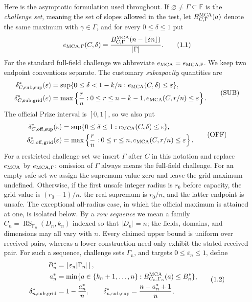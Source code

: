 \documentclass[11pt,a4paper]{amsart}
\numberwithin{equation}{section}
\theoremstyle{remark}
\DeclareMathOperator{\RS}{RS}
\newcommand{\F}{\mathbb F}
\newcommand{\eps}{\varepsilon}
\newcommand{\abs}[1]{\lvert #1\rvert}
\newcommand{\floor}[1]{\left\lfloor #1\right\rfloor}
\begin{document}
Here is the asymptotic formulation used throughout.  If
\(\varnothing\ne\Gamma\subseteq\F\) is the \emph{challenge set}, meaning
the set of slopes allowed in the test, let
\(B_{C,\Gamma}^{\rm MCA}(a)\) denote the same maximum with
\(\gamma\in\Gamma\), and for every \(0\le\delta\le1\) put
\[
 e_{\rm MCA,\Gamma}(C,\delta)
   =\frac{B_{C,\Gamma}^{\rm MCA}
      (n-\floor{\delta n})}{\abs\Gamma}.
 \tag{1.1}\label{eq:intro-normalized-mca}
\]
For the standard full-field challenge we abbreviate
\(e_{\rm MCA}=e_{\rm MCA,\F}\).  We keep two endpoint conventions separate.
The customary \emph{subcapacity} quantities are
\[
 \begin{split}
 \delta_{C,\mathrm{sub,sup}}^*(\eps)
   &=\sup\{0\le\delta<1-k/n:e_{\rm MCA}(C,\delta)\le\eps\},\\
 \delta_{C,\mathrm{sub,grid}}^*(\eps)
   &=\max\left\{\frac rn:0\le r\le n-k-1,
          e_{\rm MCA}(C,r/n)\le\eps\right\}.
 \end{split}                                      \tag{SUB}
 \label{eq:intro-subcapacity-thresholds}
\]
The official Prize interval is \([0,1]\), so we also put
\[
 \begin{split}
 \delta_{C,\mathrm{off,sup}}^*(\eps)
   &=\sup\{0\le\delta\le1:e_{\rm MCA}(C,\delta)\le\eps\},\\
 \delta_{C,\mathrm{off,grid}}^*(\eps)
   &=\max\left\{\frac rn:0\le r\le n,
          e_{\rm MCA}(C,r/n)\le\eps\right\}.
 \end{split}                                      \tag{OFF}
\label{eq:intro-official-thresholds}
\]
For a restricted challenge set we insert \(\Gamma\) after \(C\) in this
notation and replace \(e_{\rm MCA}\) by \(e_{\rm MCA,\Gamma}\); omission of
\(\Gamma\) always means the full-field challenge.
For an empty safe set we assign the supremum value zero and leave the grid
maximum undefined.  Otherwise, if the
first unsafe integer radius is \(r_0\) before capacity, the grid value is
\((r_0-1)/n\), the real supremum is \(r_0/n\), and the latter endpoint is
unsafe.  The exceptional all-radius case, in which the official maximum is
attained at one, is isolated below.
By a \emph{row sequence} we mean a family
\(C_n=\RS_{\F_n}(D_n,k_n)\) indexed so that \(\abs{D_n}=n\); the fields,
domains, and dimensions may all vary with \(n\).  Every claimed upper
bound is uniform over received pairs, whereas a lower construction need
only exhibit the stated received pair.  For such a sequence,
challenge sets
\(\Gamma_n\), and targets \(0\le\eps_n\le1\), define
\[
 \begin{split}
 B_n^*&=\floor{\eps_n\abs{\Gamma_n}},\\
 a_n^*&=\min\{a\in\{k_n+1,\ldots,n\}:
              B_{C_n,\Gamma_n}^{\rm MCA}(a)\le B_n^*\},\\
 \delta_{n,\mathrm{sub,grid}}^*&=1-\frac{a_n^*}{n},\qquad
 \delta_{n,\mathrm{sub,sup}}^*=\frac{n-a_n^*+1}{n},
 \end{split}
 \tag{1.2}\label{eq:intro-asymptotic-threshold}
\]
\end{document}
